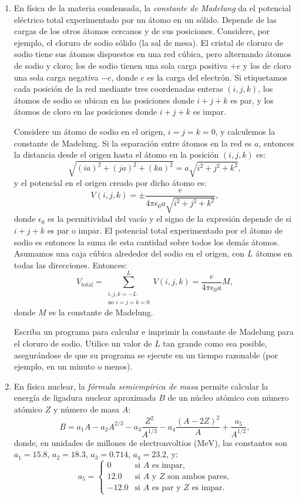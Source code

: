 \documentclass[12pt]{article}
\begin{document}
\begin{problemas}[]
\begin{enumerate}[leftmargin=*]

\item En física de la materia condensada, la \textit{constante de Madelung} da el potencial eléctrico total experimentado por un 
átomo en un sólido. Depende de las cargas de los otros átomos cercanos y de sus posiciones. Considere, por ejemplo, el cloruro de 
sodio sólido (la sal de mesa). El cristal de cloruro de sodio tiene sus átomos dispuestos en una red cúbica, 
pero alternando átomos de sodio y cloro; los de sodio tienen una sola carga positiva $+e$ y los de cloro una sola carga negativa $-e$, 
donde $e$ es la carga del electrón. Si etiquetamos cada posición de la red mediante tres coordenadas enteras $(i, j, k)$, 
los átomos de sodio se ubican en las posiciones donde $i + j + k$ es par, y los átomos de cloro en las posiciones 
donde $i + j + k$ es impar.

Considere un átomo de sodio en el origen, $i = j = k = 0$, y calculemos la constante de Madelung. 
Si la separación entre átomos en la red es $a$, entonces la distancia desde el origen hasta el átomo en la posición $(i, j, k)$ es:
\[
\sqrt{(ia)^2 + (ja)^2 + (ka)^2} = a \sqrt{i^2 + j^2 + k^2},
\]
y el potencial en el origen creado por dicho átomo es:
\[
V(i, j, k) = \pm \frac{e}{4\pi\epsilon_0 a \sqrt{i^2 + j^2 + k^2}},
\]
donde $\epsilon_0$ es la permitividad del vacío y el signo de la expresión depende de si $i + j + k$ es par o impar. 
El potencial total experimentado por el átomo de sodio es entonces la suma de esta cantidad sobre todos los demás átomos. 
Asumamos una caja cúbica alrededor del sodio en el origen, con $L$ átomos en todas las direcciones. Entonces:
\[
V_{\text{total}} = \sum_{\substack{i, j, k = -L \\ \text{no } i=j=k=0}}^{L} V(i, j, k) = \frac{e}{4\pi\epsilon_0 a} M,
\]
donde $M$ es la constante de Madelung. 

Escriba un programa para calcular e imprimir la constante de Madelung para el cloruro de sodio. 
Utilice un valor de $L$ tan grande como sea posible, asegurándose de que su programa se ejecute en un tiempo razonable (por ejemplo, 
en un minuto o menos).

\item En física nuclear, la \textit{fórmula semiempírica de masa} permite calcular la energía de ligadura nuclear aproximada $B$ 
de un núcleo atómico con número atómico $Z$ y número de masa $A$:
\[
B = a_1 A - a_2 A^{2/3} - a_3 \frac{Z^2}{A^{1/3}} - a_4 \frac{(A - 2Z)^2}{A} + \frac{a_5}{A^{1/2}},
\]
donde, en unidades de millones de electronvoltios ($\text{MeV}$), las constantes son $a_1 = 15.8$, 
$a_2 = 18.3$, $a_3 = 0.714$, $a_4 = 23.2$, y:
\[
a_5 = \begin{cases} 
0 & \text{si } A \text{ es impar,} \\ 
12.0 & \text{si } A \text{ y } Z \text{ son ambos pares,} \\ 
-12.0 & \text{si } A \text{ es par y } Z \text{ es impar.} 
\end{cases}
\]


\end{enumerate}
\end{problemas}
\end{document}
